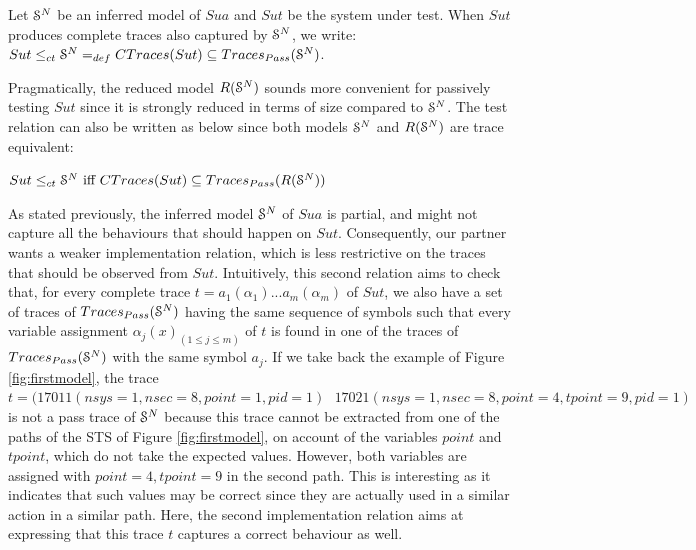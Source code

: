 \begin{definition}
\label{rel:impl1}
Let $\EuScript{S}^{N}$ be an inferred model of $\mathit{Sua}$ and
$\mathit{Sut}$ be the system under test. When $\mathit{Sut}$ produces complete
traces also captured by $\EuScript{S}^{N}$, we write:
${Sut} \leq_{ct} \EuScript{S}^{N} =_{def} CTraces({Sut}) \subseteq  Traces_{Pass}(\EuScript{S}^{N})$.
\end{definition}

Pragmatically, the reduced model $R(\EuScript{S}^{N})$ sounds
more convenient for passively testing $\mathit{Sut}$ since it is
strongly reduced in terms of size compared to $\EuScript{S}^{N}$.
The test relation can also be written as below since both models
$\EuScript{S}^{N}$ and $R(\EuScript{S}^{N})$ are trace equivalent:

\begin{proposition}
\label{rel:impl12}
${Sut} \leq_{ct} \EuScript{S}^{N} \text{ iff } CTraces({Sut}) \subseteq  Traces_{Pass}(R(\EuScript{S}^{N}))$
\end{proposition}

As stated previously, the inferred model $\EuScript{S}^{N}$ of
$\mathit{Sua}$ is partial, and might not capture all the
behaviours that should happen on $\mathit{Sut}$. Consequently,
our partner wants a weaker implementation relation, which is less
restrictive on the traces that should be observed from
$\mathit{Sut}$.  Intuitively, this second relation aims to check
that, for every complete trace $t=a_1(\alpha_1)...a_m(\alpha_m)$
of $\mathit{Sut}$, we also have a set of traces of
$Traces_{Pass}(\EuScript{S}^{N})$ having the same sequence of
symbols such that every variable assignment $\alpha_j(x)_{(1 \leq
j \leq m)}$ of $t$ is found in one of the traces of
$Traces_{Pass}(\EuScript{S}^{N})$ with the same symbol $a_j$.
If we take back the example of Figure \ref{fig:firstmodel}, the
trace $t=(17011(nsys=1,nsec=8,point=1,pid=1)\text{ }
17021(nsys=1,nsec=8,point=4,tpoint=9,pid=1)$ is not a pass trace
of $\EuScript{S}^{N}$ because this trace cannot be extracted from
one of the paths of the STS of Figure \ref{fig:firstmodel}, on
account of the variables $point$ and $tpoint$, which do not take
the expected values. However, both variables are assigned with
$point=4,tpoint=9$ in the second path. This is interesting as it
indicates that such values may be correct since they are actually
used in a similar action in a similar path. Here, the second
implementation relation aims at expressing that this trace $t$
captures a correct behaviour as well.

